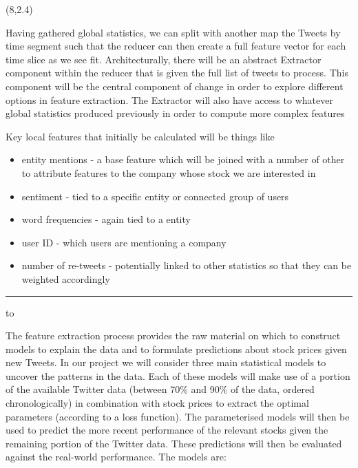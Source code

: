 \documentclass[a0]{a0poster}
\def\Head#1{\noindent\hbox to \hsize{\hfil{\LARGE\color{DarkBlue}\sf #1}}\bigskip}
\def\Subhead#1{\noindent{\large\color{DarkBlue}\sf #1}\bigskip}
\begin{document}
\begin{textblock}{7}(8,2.4)

\Subhead{Extractor}

\sf
Having gathered global statistics, we can split with another map the Tweets by time segment such that the reducer can then create a full feature vector for each time slice as we see fit.
Architecturally, there will be an abstract Extractor component within the reducer that is given the full list of tweets to process.
This component will be the central component of change in order to explore different options in feature extraction.
The Extractor will also have access to whatever global statistics produced previously in order to compute more complex features

\sf
Key local features that initially be calculated will be things like
\begin{itemize}
\item entity mentions - a base feature which will be joined with a number of other to attribute features to the company whose stock we are interested in
\item sentiment - tied to a specific entity or connected group of users
\item word frequencies - again tied to a entity
\item user ID - which users are mentioning a company
\item number of re-tweets - potentially linked to other statistics so that they can be weighted accordingly
\end{itemize}

\bigskip
\hrule





\Head{Machine Learning}

\sf
The feature extraction process provides the raw material on which to construct models to explain the data and to formulate predictions about stock prices given new Tweets. In our project we will consider three main statistical models to uncover the patterns in the data.
Each of these models will make use of a portion of the available Twitter data (between 70\% and 90\% of the data, ordered chronologically) in combination with stock prices to extract the optimal parameters (according to a loss function). The parameterised models will then be used to predict the more recent performance of the relevant stocks given the remaining portion of the Twitter data. These predictions will then be evaluated against the real-world performance. 
The models are:


\end{textblock}
\end{document}
